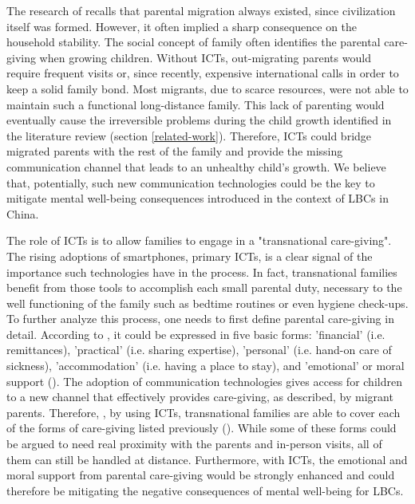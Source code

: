 The research of \textcite{bacigalupe2011virtualizing} recalls that parental migration always existed, since civilization itself was formed. However, it often implied a sharp consequence on the household stability. The social concept of family often identifies the parental care-giving when growing children. Without ICTs, out-migrating parents would require frequent visits or, since recently, expensive international calls in order to keep a solid family bond. Most migrants, due to scarce resources, were not able to maintain such a functional long-distance family. This lack of parenting would eventually cause the irreversible problems during the child growth identified in the literature review (section \ref{related-work}). Therefore, ICTs could bridge migrated parents with the rest of the family and provide the missing communication channel that leads to an unhealthy child's growth. We believe that, potentially, such new communication technologies could be the key to mitigate mental well-being consequences introduced in the context of LBCs in China.

The role of ICTs is to allow families to engage in a "transnational care-giving". The rising adoptions of smartphones, primary ICTs, is a clear signal of the importance such technologies have in the process. In fact, transnational families benefit from those tools to accomplish each small parental duty, necessary to the well functioning of the family such as bedtime routines or even hygiene check-ups. To further analyze this process, one needs to first define parental care-giving in detail. According to \textcite{finch1989family}, it could be expressed in five basic forms: 'financial' (i.e. remittances), 'practical' (i.e. sharing expertise), 'personal' (i.e. hand-on care of sickness), 'accommodation' (i.e. having a place to stay), and 'emotional' or moral support (\cite{bacigalupe2011virtualizing}). The adoption of communication technologies gives access for children to a new channel that effectively provides care-giving, as described, by migrant parents. Therefore, , by using ICTs, transnational families are able to cover each of the forms of care-giving listed previously (\cite{baldassar2007transnational}). While some of these forms could be argued to need real proximity with the parents and in-person visits, all of them can still be handled at distance. Furthermore, with ICTs, the emotional and moral support from parental care-giving would be strongly enhanced and could therefore be mitigating the negative consequences of mental well-being for LBCs.

